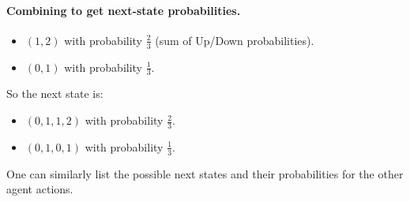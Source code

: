 \begin{enumerate}
    \paragraph{Combining to get next-state probabilities.}
    \begin{itemize}
      \item \((1,2)\) with probability \(\frac{2}{3}\) (sum of Up/Down probabilities).
      \item \((0,1)\) with probability \(\frac{1}{3}\).
    \end{itemize}

    So the next state is:
    \begin{itemize}
      \item \((0,1,1,2)\) with probability \(\frac{2}{3}\).
      \item \((0,1,0,1)\) with probability \(\frac{1}{3}\).
    \end{itemize}

    One can similarly list the possible next states and their probabilities for the other agent actions.

\end{enumerate}

